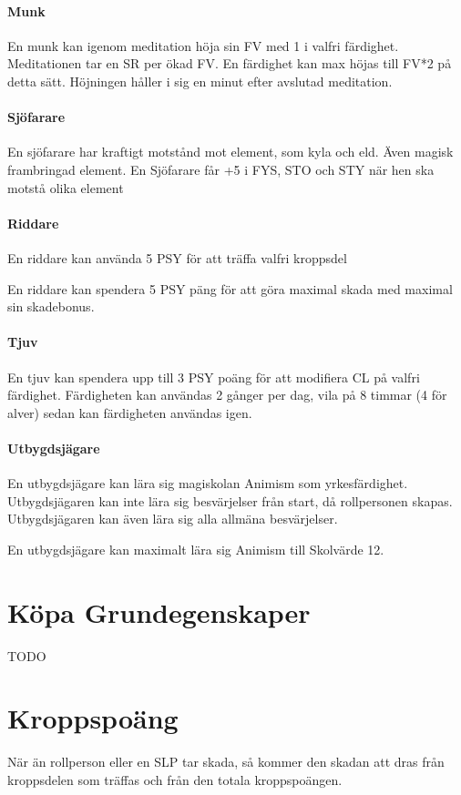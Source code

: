 \documentclass[a4paper, 10pt, titlepage]{article}
\begin{document}
\paragraph{Munk} En munk kan igenom meditation höja sin FV med 1 i valfri färdighet.
Meditationen tar en SR per ökad FV. En färdighet kan max höjas till FV*2 på detta sätt.
Höjningen håller i sig en minut efter avslutad meditation.

\paragraph{Sjöfarare} En sjöfarare har kraftigt motstånd mot element, som kyla och eld.
Även magisk frambringad element. En Sjöfarare får +5 i FYS, STO och STY när hen ska
motstå olika element

\paragraph{Riddare} En riddare kan använda 5 PSY för att träffa valfri kroppsdel

En riddare kan spendera 5 PSY päng för att göra maximal skada med maximal sin skadebonus.

\paragraph{Tjuv} En tjuv kan spendera upp till 3 PSY poäng för att modifiera CL på valfri
färdighet. Färdigheten kan användas 2 gånger per dag, vila på 8 timmar (4 för alver) sedan
kan färdigheten användas igen.

\paragraph{Utbygdsjägare} En utbygdsjägare kan lära sig magiskolan Animism som yrkesfärdighet.
Utbygdsjägaren kan inte lära sig besvärjelser från start, då rollpersonen skapas.
Utbygdsjägaren kan även lära sig alla allmäna besvärjelser.

En utbygdsjägare kan maximalt lära sig Animism till Skolvärde 12.


\section{Köpa Grundegenskaper}

TODO

\section{Kroppspoäng}
När än rollperson eller en SLP tar skada, så kommer den skadan att dras från kroppsdelen som träffas och från
den totala kroppspoängen.
\end{document}
